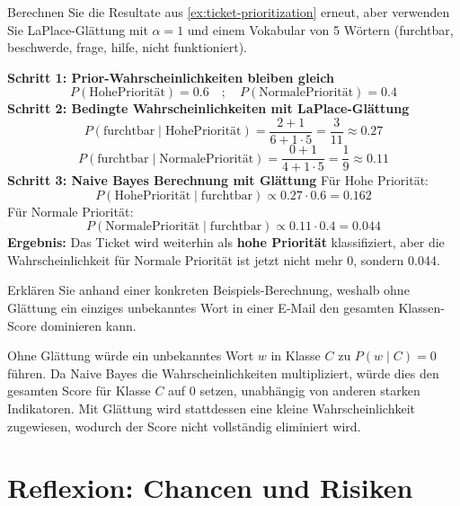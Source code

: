 \begin{mychallenge}
    Berechnen Sie die Resultate aus \cref{ex:ticket-prioritization} erneut, aber verwenden Sie LaPlace-Glättung mit $\alpha=1$ und einem Vokabular von 5 Wörtern (furchtbar, beschwerde, frage, hilfe, nicht funktioniert).
    \begin{myanswer}
        \textbf{Schritt 1: Prior-Wahrscheinlichkeiten bleiben gleich}
        \[
            P(\text{HohePriorität}) = 0.6 \quad ; \quad P(\text{NormalePriorität}) = 0.4
        \]
        \textbf{Schritt 2: Bedingte Wahrscheinlichkeiten mit LaPlace-Glättung}
        \[
            P(\text{furchtbar}\mid\text{HohePriorität}) = \frac{2 + 1}{6 + 1 \cdot 5} = \frac{3}{11} \approx 0.27
        \]
        \[
            P(\text{furchtbar}\mid\text{NormalePriorität}) = \frac{0 + 1}{4 + 1 \cdot 5} = \frac{1}{9} \approx 0.11
        \]
        \textbf{Schritt 3: Naive Bayes Berechnung mit Glättung}
        Für Hohe Priorität:
        \[
            P(\text{HohePriorität}\mid\text{furchtbar}) \propto 0.27 \cdot 0.6 = 0.162
        \]
        Für Normale Priorität:
        \[
            P(\text{NormalePriorität}\mid\text{furchtbar}) \propto 0.11 \cdot 0.4 = 0.044
        \]
        \textbf{Ergebnis:} Das Ticket wird weiterhin als \textbf{hohe Priorität} klassifiziert, aber die Wahrscheinlichkeit für Normale Priorität ist jetzt nicht mehr 0, sondern 0.044.
    \end{myanswer}
\end{mychallenge}

\begin{myexercise}
    Erklären Sie anhand einer konkreten Beispiels-Berechnung, weshalb ohne Glättung ein einziges unbekanntes Wort
    in einer E-Mail den gesamten Klassen-Score dominieren kann.
    \begin{myanswer}
        Ohne Glättung würde ein unbekanntes Wort $w$ in Klasse $C$ zu $P(w\mid C)=0$ führen. Da Naive Bayes die Wahrscheinlichkeiten multipliziert, würde dies den gesamten Score für Klasse $C$ auf 0 setzen, unabhängig von anderen starken Indikatoren. Mit Glättung wird stattdessen eine kleine Wahrscheinlichkeit zugewiesen, wodurch der Score nicht vollständig eliminiert wird.
    \end{myanswer}
\end{myexercise}

\section{Reflexion: Chancen und Risiken}

